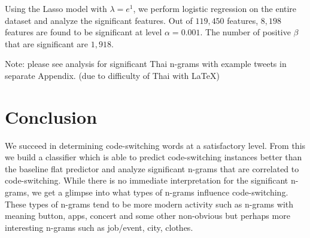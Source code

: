 \documentclass[conference]{IEEEtran}
\begin{document}
Using the Lasso model with $\lambda = e^1$, we perform logistic regression on the entire dataset and analyze the significant features. Out of $119,450$ features, $8,198$ features  are found to be significant at level $\alpha = 0.001$. The number of positive $\beta$ that are significant are $1,918$.


Note: please see analysis for significant Thai n-grams with example tweets in separate Appendix. (due to difficulty of Thai with LaTeX)















 



\section{Conclusion}
We succeed in determining code-switching words at a satisfactory level. From this we build a classifier which is able to predict code-switching instances better than the baseline flat predictor and  analyze significant n-grams that are correlated to code-switching. While there is no immediate interpretation for the significant n-grams, we get a glimpse into what types of n-grams influence code-switching. These types of n-grams tend to be more modern activity such as n-grams with meaning button, apps, concert and some other non-obvious but perhaps more interesting n-grams such as job/event, city, clothes. 
\end{document}
